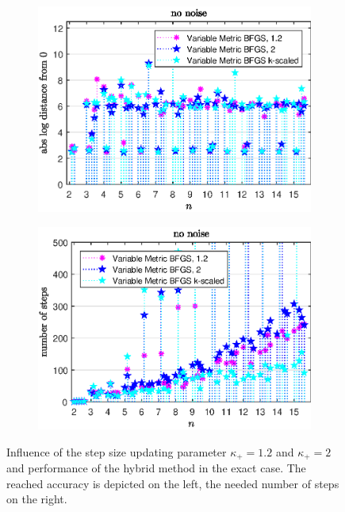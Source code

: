 \begin{figure}[ht]%
	\begin{subfigure}{0.49\textwidth}
		\includegraphics[width=\textwidth]{Pictures/Plots/no_noise_comp.eps}%
	\end{subfigure}
	\begin{subfigure}{0.49\textwidth}
		\includegraphics[width=\textwidth]{Pictures/Plots/steps_no_noise_comp.eps}%
	\end{subfigure}
	\caption[Influence of the step size updating parameter and hybrid method: no noise]{Influence of the step size updating parameter \(\kappa_+ = 1.2\) and \(\kappa_+ =2 \) and performance of the hybrid method in the exact case. The reached accuracy is depicted on the left, the needed number of steps on the right.}
	\label{fig_no_noise_comp}
\end{figure}

